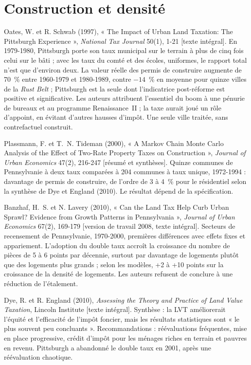 \documentclass[11pt,a4paper]{article}
\newcommand{\lu}[1]{{\footnotesize\color{ocre}[#1]}}
\begin{document}
\section{Construction et densité}

Oates, W. et R. Schwab (1997), « The Impact of Urban Land Taxation: The Pittsburgh Experience »,
\emph{National Tax Journal} 50(1), 1-21 \lu{texte intégral}. En 1979-1980, Pittsburgh porte son
taux municipal sur le terrain à plus de cinq fois celui sur le bâti ; avec les taux du comté et des
écoles, uniformes, le rapport total n'est que d'environ deux. La valeur réelle des permis de
construire augmente de 70~\% entre 1960-1979 et 1980-1989, contre $-14$~\% en moyenne pour quinze
villes de la \emph{Rust Belt} ; Pittsburgh est la seule dont l'indicatrice post-réforme est
positive et significative. Les auteurs attribuent l'essentiel du boom à une pénurie de bureaux et
au programme Renaissance~II ; la taxe aurait joué un rôle d'appoint, en évitant d'autres hausses
d'impôt. Une seule ville traitée, sans contrefactuel construit.

Plassmann, F. et T.~N. Tideman (2000), « A Markov Chain Monte Carlo Analysis of the Effect of
Two-Rate Property Taxes on Construction », \emph{Journal of Urban Economics} 47(2), 216-247
\lu{résumé et synthèses}. Quinze communes de Pennsylvanie à deux taux comparées à 204 communes à
taux unique, 1972-1994 : davantage de permis de construire, de l'ordre de 3 à 4~\% pour le
résidentiel selon la synthèse de Dye et England (2010). Le résultat dépend de la spécification.

Banzhaf, H.~S. et N. Lavery (2010), « Can the Land Tax Help Curb Urban Sprawl? Evidence from
Growth Patterns in Pennsylvania », \emph{Journal of Urban Economics} 67(2), 169-179 \lu{version de
travail 2008, texte intégral}. Secteurs de recensement de Pennsylvanie, 1970-2000, premières
différences avec effets fixes et appariement. L'adoption du double taux accroît la croissance du
nombre de pièces de 5 à 6 points par décennie, surtout par davantage de logements plutôt que des
logements plus grands ; selon les modèles, +2 à +10 points sur la croissance de la densité de
logements. Les auteurs refusent de conclure à une réduction de l'étalement.

Dye, R. et R. England (2010), \emph{Assessing the Theory and Practice of Land Value Taxation},
Lincoln Institute \lu{texte intégral}. Synthèse : la LVT améliorerait l'équité et l'efficacité de
l'impôt foncier, mais les résultats statistiques sont « le plus souvent peu concluants ».
Recommandations : réévaluations fréquentes, mise en place progressive, crédit d'impôt pour les
ménages riches en terrain et pauvres en revenu. Pittsburgh a abandonné le double taux en 2001,
après une réévaluation chaotique.
\end{document}
